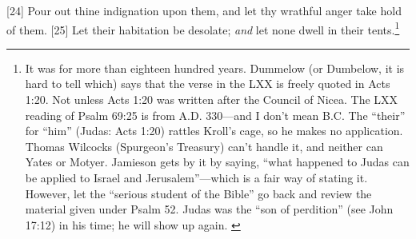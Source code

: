 [24] \textcolor[rgb]{0.00,0.00,1.00}{Pour out thine indignation upon them, and let thy wrathful anger take hold of them.}
[25] \textcolor[rgb]{0.00,0.00,1.00}{Let their habitation be desolate; \emph{and} let none dwell in their tents.}\footnote{It
was for more than eighteen hundred years.
Dummelow (or Dumbelow, it is hard to tell
which) says that the verse in the LXX is freely
quoted in Acts 1:20. Not unless Acts 1:20 was
written after the Council of Nicea. The LXX
reading of Psalm 69:25 is from A.D. 330—and I
don’t mean B.C. The “their” for “him” (Judas:
Acts 1:20) rattles Kroll’s cage, so he makes no
application. Thomas Wilcocks (Spurgeon’s
Treasury) can’t handle it, and neither can Yates or
Motyer. Jamieson gets by it by saying, “what
happened to Judas can be applied to Israel and
Jerusalem”—which is a fair way of stating it.
However, let the “serious student of the Bible” go
back and review the material given under Psalm
52. Judas was the “son of perdition” (see John
17:12) in his time; he will show up again. \cite{Ruckman1992Psalms}  }
